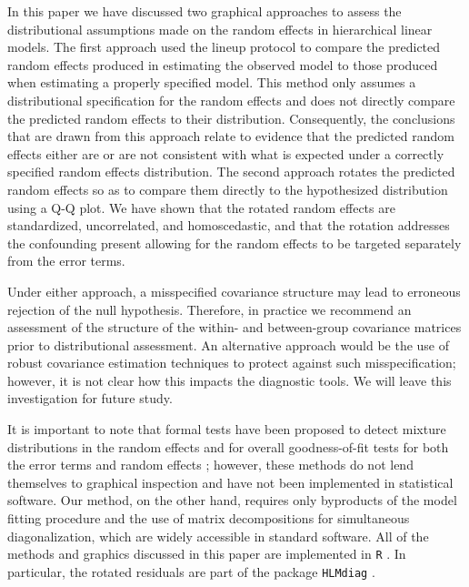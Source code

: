 \documentclass[12pt]{article} %
\newcommand{\al}[1]{{\color{red} #1}}
\begin{document}
In this paper we have discussed two graphical approaches to assess the distributional assumptions made on the random effects in hierarchical linear models. The first approach used the lineup protocol to compare the predicted random effects produced in estimating the observed model to those produced when estimating a properly specified model. This method only assumes a distributional specification for the random effects and does not directly compare the predicted random effects to their distribution. Consequently, the conclusions that are drawn from this approach relate to evidence that the predicted random effects either are or are not {consistent} with what is expected under a correctly specified random effects distribution. The second approach rotates the predicted random effects so as to compare them directly to the hypothesized distribution using a Q-Q plot. We have shown that the rotated random effects are standardized, uncorrelated, and homoscedastic, and that the rotation addresses the confounding present allowing for the random effects to be targeted separately from the error terms. 

Under either approach, a misspecified covariance structure may lead to erroneous rejection of the null hypothesis. Therefore, in practice we recommend an assessment of the structure of {the within- and between-group covariance matrices} prior to distributional assessment.
An alternative approach would be the use of robust covariance estimation techniques to protect against such misspecification; however, {it is not clear how this impacts the diagnostic tools. We will leave this investigation for future study.} %

It is important to note that formal tests have been proposed  to detect mixture distributions in the random effects \citep{Verbeke:1996va} and for overall goodness-of-fit tests for both the error terms and random effects \citep{Jiang:2001dx}; however, these methods do not lend themselves to graphical inspection and have not been implemented in statistical software. Our method, on the other hand, requires only byproducts of the model fitting procedure and the use of matrix decompositions for simultaneous diagonalization, which are widely accessible in standard software. All of the methods and graphics discussed in this paper are implemented in  \texttt{R} \citep{R}. In particular, the rotated residuals are part of the package \texttt{HLMdiag} \citep{HLMdiag, Loy:JSS}.
\end{document}
